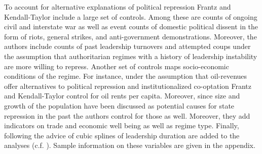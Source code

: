 To account for alternative explanations of political repression Frantz and Kendall-Taylor include a large set
of controls. Among these are counts of ongoing civil and 
interstate war as well as event counts of domestic 
political dissent in the form of riots, general strikes, 
and anti-government demonstrations. Moreover, the authors 
include counts of past leadership turnovers and attempted 
coups under the assumption that authoritarian regimes with 
a history of leadership instability are more willing to 
repress. Another set of controls maps socio-economic 
conditions of the regime. For instance, under the 
assumption that oil-revenues offer alternatives to political
repression and institutionalized co-optation Frantz and 
Kendall-Taylor control for oil rents per capita. Moreover, 
since size and growth of the population have been discussed 
as potential causes for state repression in the 
past the authors control for those as well. Moreover, they
add indicators on trade and economic well being as well as
regime type. Finally, following the advice of 
\citet{Carter.2010} cubic splines of leadership duration 
are added to the analyses (c.f. \cite[338]{Frantz.2014}). 
Sample information on these variables are given in the 
appendix.


